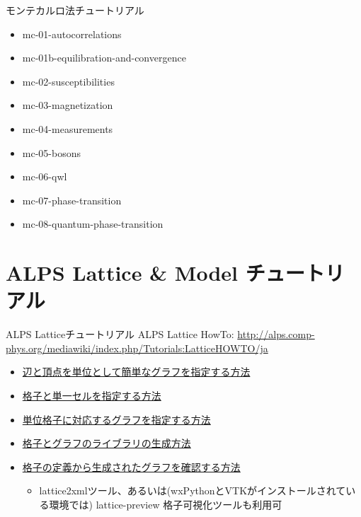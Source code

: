 \begin{frame}{モンテカルロ法チュートリアル}
  \begin{itemize}
  \item mc-01-autocorrelations
  \item mc-01b-equilibration-and-convergence
  \item mc-02-susceptibilities
  \item mc-03-magnetization
  \item mc-04-measurements
  \item mc-05-bosons
  \item mc-06-qwl
  \item mc-07-phase-transition
  \item mc-08-quantum-phase-transition
  \end{itemize}
\end{frame}

\section{ALPS Lattice \& Model チュートリアル}

\begin{frame}{ALPS Latticeチュートリアル}
  ALPS Lattice HowTo: {\footnotesize \url{http://alps.comp-phys.org/mediawiki/index.php/Tutorials:LatticeHOWTO/ja}} \\
  \begin{itemize}
    \item \href{http://alps.comp-phys.org/mediawiki/index.php/Tutorials:LatticeHOWTO:SimpleGraphs/ja}{辺と頂点を単位として簡単なグラフを指定する方法}
    \item \href{http://alps.comp-phys.org/mediawiki/index.php/Tutorials:LatticesAndUnitCells/ja}{格子と単一セルを指定する方法}
    \item \href{http://alps.comp-phys.org/mediawiki/index.php/Tutorials:LatticesAndGraphs/ja}{単位格子に対応するグラフを指定する方法}
    \item \href{http://alps.comp-phys.org/mediawiki/index.php/Tutorials:LatticeHOWTO:Library/ja}{格子とグラフのライブラリの生成方法}
    \item \href{http://alps.comp-phys.org/mediawiki/index.php/Tutorials:LatticeHowto:CheckLattice/ja}{格子の定義から生成されたグラフを確認する方法}
      \begin{itemize}
      \item lattice2xmlツール、あるいは(wxPythonとVTKがインストールされている環境では) lattice-preview 格子可視化ツールも利用可
      \end{itemize}
  \end{itemize}
\end{frame}


